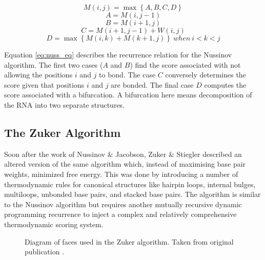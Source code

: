 \documentclass[12pt, a4paper]{article}
\begin{document}

\begin{equation} \label{eq:nuss_eq}
	M(i, j) = \max \left\lbrace A, B, C, D \right\rbrace
\end{equation}
\[
A = M(i, j-1)
\]
\[
B = M(i+1, j)
\]
\[
C = M(i+1, j-1) + W(i, j)
\]
\[
D = \max \left\lbrace M(i, k) + M(k+1, j) \right\rbrace \: when \: i < k < j
\]


Equation \ref{eq:nuss_eq} describes the recurrence relation for the Nussinov algorithm. The first two cases ($A$ and $B$) find the score associated with not allowing the positions $i$ and $j$ to bond. The case $C$ conversely determines the score given that positions $i$ and $j$ are bonded. The final case $D$ computes the score associated with a bifurcation. A bifurcation here means decomposition of the RNA into two separate structures.


\subsection{The Zuker Algorithm}
Soon after the work of Nussinov \& Jacobson, Zuker \& Stiegler \cite{zuker1981optimal}
described an altered version of the same algorithm which, instead of maximising
base pair weights, minimized free energy. This was done
by introducing a number of thermodynamic rules for canonical structures like
hairpin loops, internal bulges, multiloops, unbonded base pairs, and stacked base
pairs. The algorithm is similar to the Nussinov algorithm
but requires another mutually recursive dynamic programming recurrence to inject
a complex and relatively comprehensive thermodynamic scoring system.


\begin{figure}
\begin{center}
\end{center}
\caption{Diagram of faces used in the Zuker algorithm. Taken from original
publication \cite{zuker1981optimal}.}
\label{zuk_struct}
\end{figure}
\end{document}
